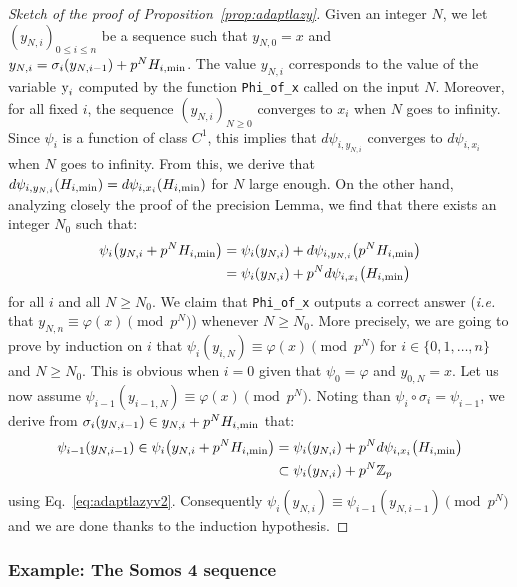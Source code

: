 \documentclass[11pt]{article}
\numberwithin{equation}{section}
\numberwithin{figure}{section}
\renewcommand{\leq}{\leqslant}
\renewcommand{\geq}{\geqslant}
\theoremstyle{definition}
\newcommand{\Z}{\mathbb Z}
\newcommand{\Zp}{\Z_p}
\renewcommand{\min}{\text{\rm min}}
\newcommand{\tty}{\texttt{\rm y}\xspace}
\begin{document}
\begin{proof}[Sketch of the proof of Proposition~\ref{prop:adaptlazy}]
Given an integer $N$, we let $(y_{N,i})_{0 \leq i \leq n}$ be a 
sequence such that $y_{N,0} = x$ and $y_{N,i} = \sigma_i(y_{N,i-1}) +
p^N H_{i,\min}$.
The value $y_{N,i}$ corresponds to the value of the variable $\tty_i$ 
computed by the function \texttt{Phi\_of\_x} called on the input $N$. 
Moreover, for all fixed $i$, the sequence $(y_{N,i})_{N \geq 0}$ 
converges to $x_i$ when $N$ goes to infinity. Since $\psi_i$ is a 
function of class $C^1$, this implies that $d\psi_{i,y_{N,i}}$ converges 
to $d\psi_{i,x_i}$ when $N$ goes to infinity. From this, we derive that
$d \psi_{i,y_{N,i}}(H_{i,\min}) = d \psi_{i,x_i}(H_{i,\min})$
for $N$ large enough. On the other hand, analyzing closely the proof of the precision 
Lemma, we find that there exists an integer $N_0$ such that:
\begin{align}
\psi_i\big(y_{N,i} + p^N H_{i,\min}\big) 
& = \psi_i(y_{N,i}) + d \psi_{i,y_{N,i}}\big(p^N H_{i,\min}\big) \nonumber \\
& = \psi_i(y_{N,i}) + p^N d \psi_{i,x_i}\big(H_{i,\min}\big)
\label{eq:adaptlazyv2}
\end{align}
for all $i$ and all $N \geq N_0$. We claim that \textrm{\tt Phi\_of\_x} 
outputs a correct answer (\emph{i.e.} that $y_{N,n} \equiv \varphi(x) 
\pmod{p^N}$) whenever $N \geq N_0$. More precisely, we are going to prove by
induction on $i$ that $\psi_i(y_{i,N}) \equiv \varphi(x) \pmod{p^N}$
for $i \in \{0, 1, \ldots, n\}$ and $N \geq N_0$. This is obvious
when $i = 0$ given that $\psi_0 = \varphi$ and $y_{0,N} = x$. Let us
now assume $\psi_{i-1}(y_{i-1,N}) \equiv \varphi(x) \pmod{p^N}$. 
Noting than $\psi_i \circ \sigma_i = \psi_{i-1}$, we derive from
$\sigma_i(y_{N,i-1}) \in y_{N,i} + p^N H_{i,\min}$ that:
\begin{align*}
\psi_{i-1}(y_{N,i-1}) \in \psi_i\big(y_{N,i} + p^N H_{i,\min}\big)
& = \psi_i(y_{N,i}) + p^N d \psi_{i,x_i}\big(H_{i,\min}\big) \\
& \subset \psi_i(y_{N,i}) + p^N \Zp
\end{align*}
using Eq.~\eqref{eq:adaptlazyv2}.
Consequently $\psi_i(y_{N,i}) \equiv \psi_{i-1}(y_{N,i-1}) 
\pmod{p^N}$ and we are done thanks to the induction hypothesis.
\end{proof}

\subsubsection{Example: The Somos 4 sequence}
\label{sssec:somos}
\end{document}

